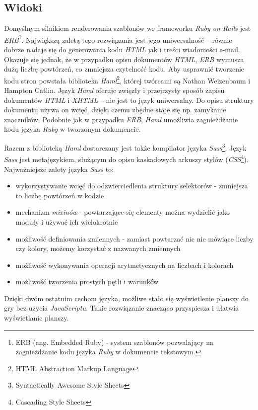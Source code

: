 \documentclass[a4paper,12pt]{article}
\begin{document}
\subsection{Widoki}
Domyślnym silnikiem renderowania szablonów we frameworku \emph{Ruby on
  Rails} jest \emph{ERB}\footnote{ERB (ang. Embedded Ruby) - system
  szablonów pozwalający na zagnieżdżanie kodu języka \emph{Ruby} w
  dokumencie tekstowym.}. Największą zaletą tego rozwiązania jest jego
uniwersalność -- równie dobrze nadaje się do generowania kodu
\emph{HTML} jak i treści wiadomości e-mail. Okazuje się jednak, że w
przypadku opisu dokumentów \emph{HTML}, \emph{ERB} wymusza dużą liczbę
powtórzeń, co zmniejsza czytelność kodu. Aby usprawnić tworzenie kodu
stron powstała biblioteka \emph{Haml}\footnote{HTML Abstraction Markup
  Language}, której twórcami są Nathan Weizenbaum i Hampton
Catlin. Język \emph{Haml} oferuje zwięzły i przejrzysty sposób zapisu
dokumentów \emph{HTML} i \emph{XHTML} -- nie jest to język
uniwersalny. Do opisu struktury dokumentu używa on wcięć, dzięki czemu
zbędne staje się np. zamykanie znaczników. Podobnie jak w przypadku
\emph{ERB}, \emph{Haml} umożliwia zagnieżdżanie kodu języka
\emph{Ruby} w tworzonym dokumencie.

Razem z biblioteką \emph{Haml} dostarczany jest także kompilator
języka \emph{Sass}\footnote{Syntactically Awesome Style Sheets}. Język
\emph{Sass} jest metajęzykiem, służącym do opisu kaskadowych arkuszy
stylów (\emph{CSS}\footnote{Cascading Style Sheets}). Najważniejsze
zalety języka \emph{Sass} to:

\begin{itemize}
\item wykorzystywanie wcięć do odzwierciedlenia struktury selektorów -
  zmniejsza to liczbę powtórzeń w kodzie
\item mechanizm \emph{mixinów} - powtarzające się elementy można
  wydzielić jako moduły i używać ich wielokrotnie
\item możliwość definiowania zmiennych - zamiast powtarzać nic nie
  mówiące liczby czy kolory, możemy korzystać z nazwanych
  zmiennych
\item możliwość wykonywania operacji arytmetycznych na liczbach i
  kolorach
\item możliwość tworzenia prostych pętli i warunków
\end{itemize}

Dzięki dwóm ostatnim cechom języka, możliwe stało się wyświetlenie
planszy do gry bez użycia \emph{JavaScriptu}. Takie rozwiązanie
znacząco przyspiesza i ułatwia wyświetlanie planszy.
\end{document}
